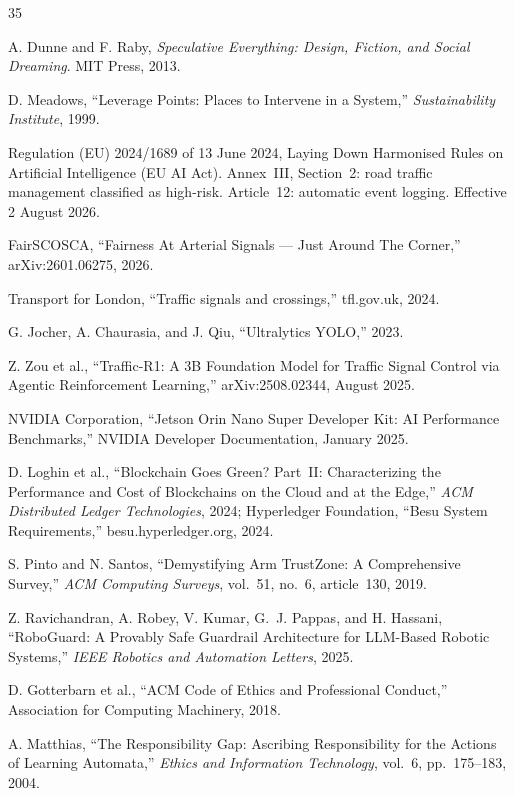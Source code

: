 \documentclass[sigconf,nonacm]{acmart}
\begin{document}
\begin{thebibliography}{35}

A. Dunne and F. Raby, \textit{Speculative Everything: Design, Fiction, and Social Dreaming}. MIT Press, 2013.

D. Meadows, ``Leverage Points: Places to Intervene in a System,'' \textit{Sustainability Institute}, 1999.

Regulation (EU) 2024/1689 of 13 June 2024, Laying Down Harmonised Rules on Artificial Intelligence (EU AI Act). Annex~III, Section~2: road traffic management classified as high-risk. Article~12: automatic event logging. Effective 2 August 2026.

FairSCOSCA, ``Fairness At Arterial Signals --- Just Around The Corner,'' arXiv:2601.06275, 2026.

Transport for London, ``Traffic signals and crossings,'' tfl.gov.uk, 2024.

G. Jocher, A. Chaurasia, and J. Qiu, ``Ultralytics YOLO,'' 2023.

Z. Zou et al., ``Traffic-R1: A 3B Foundation Model for Traffic Signal Control via Agentic Reinforcement Learning,'' arXiv:2508.02344, August 2025.

NVIDIA Corporation, ``Jetson Orin Nano Super Developer Kit: AI Performance Benchmarks,'' NVIDIA Developer Documentation, January 2025.

D. Loghin et al., ``Blockchain Goes Green? Part~II: Characterizing the Performance and Cost of Blockchains on the Cloud and at the Edge,'' \textit{ACM Distributed Ledger Technologies}, 2024; Hyperledger Foundation, ``Besu System Requirements,'' besu.hyperledger.org, 2024.

S. Pinto and N. Santos, ``Demystifying Arm TrustZone: A Comprehensive Survey,'' \textit{ACM Computing Surveys}, vol.~51, no.~6, article~130, 2019.

Z. Ravichandran, A. Robey, V. Kumar, G.~J. Pappas, and H. Hassani, ``RoboGuard: A Provably Safe Guardrail Architecture for LLM-Based Robotic Systems,'' \textit{IEEE Robotics and Automation Letters}, 2025.

D. Gotterbarn et al., ``ACM Code of Ethics and Professional Conduct,'' Association for Computing Machinery, 2018.

A. Matthias, ``The Responsibility Gap: Ascribing Responsibility for the Actions of Learning Automata,'' \textit{Ethics and Information Technology}, vol.~6, pp.~175--183, 2004.


\end{thebibliography}
\end{document}
